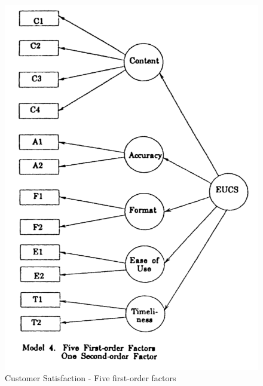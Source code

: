\begin{figure}
	\centering
	\includegraphics[width=1.0\textwidth]{img/dollSecondFactor.png}
	\caption{Customer Satisfaction - Five first-order factors \cite{doll1994confirmatory}}
	\label{fig:relatedDoll}
\end{figure} 

